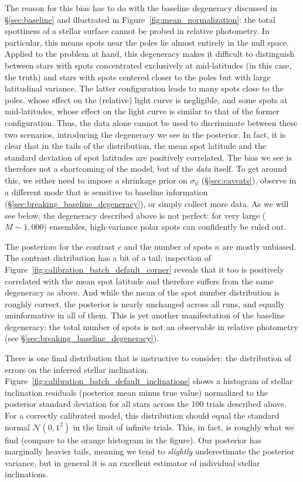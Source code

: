 \documentclass[modern]{aastex62}
\begin{document}
The reason for this bias has to do with the baseline degeneracy discussed in
\S\ref{sec:baseline} and illustrated in Figure~\ref{fig:mean_normalization}:
the total spottiness of a stellar surface cannot be probed in relative
photometry. In particular, this means spots near the poles lie almost
entirely in the null space. Applied to the problem at hand, this degeneracy
makes it difficult to distinguish between stars with spots concentrated
exclusively at mid-latitudes (in this case, the truth) and
stars with spots centered closer to the poles but with large latitudinal
variance. The latter configuration leads to many spots close to the poles,
whose effect on the (relative) light curve is negligible, and some spots
at mid-latitudes, whose effect on the light curve is similar to that of
the former configuration.
Thus, the data alone cannot be used to discriminate between these two
scenarios, introducing the degeneracy we see in the posterior. In fact,
it is clear that in the tails of the distribution, the mean spot latitude
and the standard deviation of spot latitudes are positively correlated.
The bias we see is therefore not a shortcoming of the model, but of the
\emph{data} itself. To get around this, we either need to impose a
shrinkage prior on $\sigma_\phi$ (\S\ref{sec:caveats}),
observe in a different mode that is sensitive to baseline information
(\S\ref{sec:breaking_baseline_degeneracy}), or simply collect more data.
As we will see below, the degeneracy described above is not perfect:
for very large ($M \sim 1{,}000$) ensembles, high-variance polar spots
can confidently be ruled out.

The posteriors for the contrast $c$ and the number of spots $n$
are mostly unbiased. The contrast distribution has a bit of
a tail; inspection of Figure~\ref{fig:calibration_batch_default_corner}
reveals that it too is positively correlated with the mean spot latitude
and therefore suffers from the same degeneracy as above. And while the
mean of the spot number distribution is roughly correct, the posterior
is nearly unchanged across all runs, and equally uninformative in all
of them. This is yet another manifestation of the baseline degeneracy:
the total number of spots is not an observable in relative photometry
(see \S\ref{sec:breaking_baseline_degeneracy}).

There is one final distribution that is instructive to consider: the
distribution of errors on the inferred stellar inclination.
Figure~\ref{fig:calibration_batch_default_inclinations} shows a histogram
of stellar inclination residuals (posterior mean minus true value)
normalized to the posterior standard deviation for all stars across the
100 trials described above. For a correctly calibrated model, this distribution
should equal the standard normal $\mathcal{N}(0, 1^2)$ in the limit of
infinite trials. This, in fact, is roughly what we find (compare to the
orange histogram in the figure). Our posterior has marginally
heavier tails, meaning we tend to \emph{slightly} underestimate the
posterior variance, but in general it is an excellent estimator of
individual stellar inclinations.
\end{document}
